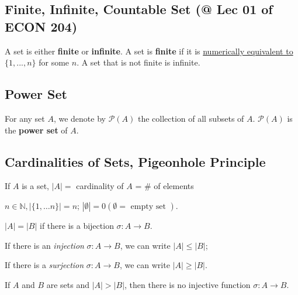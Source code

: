 \documentclass[11pt]{elegantbook}
\begin{document}
\subsection{Finite, Infinite, Countable Set \small{(@ Lec 01 of ECON 204)}}
\begin{definition}
\normalfont
    A set is either \textbf{finite} or \textbf{infinite}. A set is \textbf{finite} if it is \underline{numerically equivalent to} $\{1,...,n\}$ for some $n$. A set that is not finite is infinite.
\end{definition}


\subsection{Power Set}
\begin{definition}
    For any set $A$, we denote by $\mathcal{P}(A)$ the collection of all subsets of $A$. $\mathcal{P}(A)$ is the \textbf{power set} of $A$.
\end{definition}
\subsection{Cardinalities of Sets, Pigeonhole Principle}
\begin{definition}
    If $A$ is a set, $|A|=$ cardinality of $A$ = $\#$ of elements
\end{definition}
$n \in \mathbb{N},|\{1, \ldots n\}|=n$; $|\emptyset|=0(\emptyset=\text { empty set })$.

$|A|=|B|$ if there is a bijection $\sigma:A \rightarrow B$.

If there is an \textit{injection} $\sigma:A \rightarrow B$, we can write $|A|\leq|B|$;

If there is a \textit{surjection} $\sigma:A \rightarrow B$, we can write $|A|\geq|B|$.
\begin{theorem}
    If $A$ and $B$ are sets and $|A|>|B|$, then there is no injective function $\sigma:A \rightarrow B$.
\end{theorem}
\end{document}
